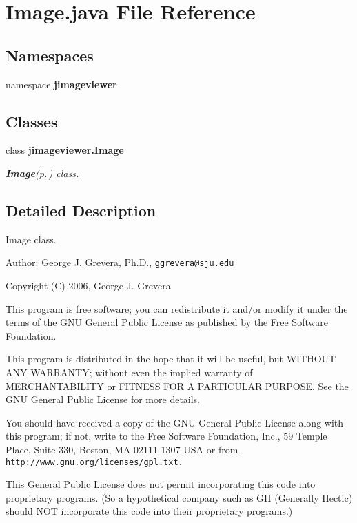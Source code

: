 \section{Image.java File Reference}
\label{_image_8java}
\subsection*{Namespaces}
\begin{CompactItemize}
\item 
namespace {\bf jimageviewer}
\end{CompactItemize}
\subsection*{Classes}
\begin{CompactItemize}
\item 
class {\bf jimageviewer.Image}
\begin{CompactList}\small\item\em {\bf Image}{\rm (p.\,\pageref{classjimageviewer_1_1_image})} class. \item\end{CompactList}\end{CompactItemize}


\subsection{Detailed Description}
Image class.

\begin{Desc}
\item[Author:]George J. Grevera, Ph.D., {\tt ggrevera@sju.edu}\end{Desc}
Copyright (C) 2006, George J. Grevera

This program is free software; you can redistribute it and/or modify it under the terms of the GNU General Public License as published by the Free Software Foundation.

This program is distributed in the hope that it will be useful, but WITHOUT ANY WARRANTY; without even the implied warranty of MERCHANTABILITY or FITNESS FOR A PARTICULAR PURPOSE. See the GNU General Public License for more details.

You should have received a copy of the GNU General Public License along with this program; if not, write to the Free Software Foundation, Inc., 59 Temple Place, Suite 330, Boston, MA 02111-1307 USA or from {\tt http://www.gnu.org/licenses/gpl.txt.}

This General Public License does not permit incorporating this code into proprietary programs. (So a hypothetical company such as GH (Generally Hectic) should NOT incorporate this code into their proprietary programs.) 